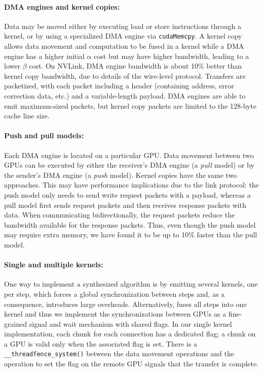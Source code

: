 \paragraph{DMA engines and kernel copies:} Data may be moved either by executing load or store instructions through a kernel, or by using a specialized DMA engine via \texttt{cudaMemcpy}. A kernel copy allows data movement and computation to be fused in a kernel while a DMA engine has a higher initial $\alpha$ cost but may have higher bandwidth, leading to a lower $\beta$ cost. On NVLink, DMA engine bandwidth is about 10\% better than kernel copy bandwidth, due to details of the wire-level protocol. Transfers are packetized, with each packet including a header (containing address, error correction data, etc.) and a variable-length payload. DMA engines are able to emit maximum-sized packets, but kernel copy packets are limited to the 128-byte cache line size.

\paragraph{Push and pull models:} Each DMA engine is located on a particular GPU. Data movement between two GPUs can be executed by either the receiver's DMA engine (a {\em pull} model) or by the sender's DMA engine (a {\em push} model). Kernel copies have the same two approaches. This may have performance implications due to the link protocol: the push model only needs to send write request packets with a payload, whereas a pull model first sends request packets and then receives response packets with data. When communicating bidirectionally, the request packets reduce the bandwidth available for the response packets. Thus, even though the push model may require extra memory, we have found it to be up to 10\% faster than the pull model.



\paragraph{Single and multiple kernels:} One way to implement a synthesized algorithm is by emitting several kernels, one per step, which forces a global synchronization between steps and, as a consequence, introduces large overheads.
Alternatively, \tool{} fuses all steps into one kernel and thus we implement the synchronizations between GPUs as a fine-grained signal and wait mechanism with shared flags. In our single kernel implementation, each chunk for each connection has a dedicated flag; a chunk on a GPU is valid 
only when the associated flag is set. There is a \texttt{\_\_threadfence\_system()} between the data movement operations and the operation to set the flag on the remote GPU signals that the transfer is complete. 

